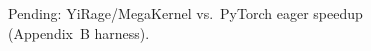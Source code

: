 \begin{figure}[t]
\centering
{}
\caption{Pending: YiRage/MegaKernel vs.\ PyTorch eager speedup (Appendix~B harness).}
\label{fig:fusion_gap}
\end{figure}
